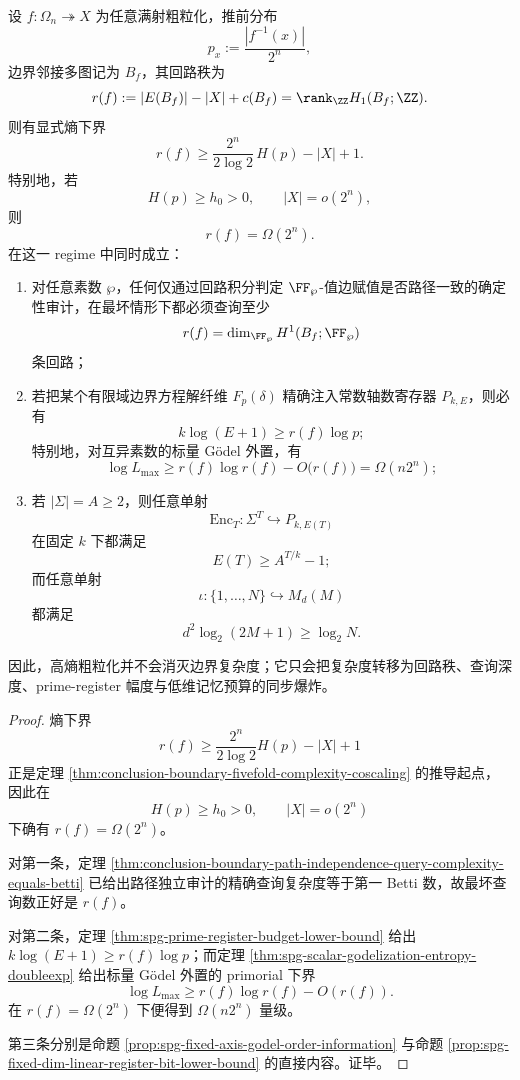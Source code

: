 \begin{theorem}\label{thm:conclusion-boundary-cycle-externalization-memory-barriers}
设 \(f:\Omega_n\twoheadrightarrow X\) 为任意满射粗粒化，推前分布
\[
p_x:=\frac{|f^{-1}(x)|}{2^n},
\]
边界邻接多图记为 \(B_f\)，其回路秩为
\[
r(f):=|E(B_f)|-|X|+c(B_f)=\rank_{\ZZ}H_1(B_f;\ZZ).
\]
则有显式熵下界
\[
r(f)\ge \frac{2^n}{2\log 2}\,H(p)-|X|+1.
\]
特别地，若
\[
H(p)\ge h_0>0,
\qquad
|X|=o(2^n),
\]
则
\[
r(f)=\Omega(2^n).
\]
在这一 regime 中同时成立：
\begin{enumerate}
  \item 对任意素数 \(\wp\)，任何仅通过回路积分判定 \(\FF_\wp\)-值边赋值是否路径一致的确定性审计，在最坏情形下都必须查询至少
  \[
  r(f)=\dim_{\FF_\wp}H^1(B_f;\FF_\wp)
  \]
  条回路；
  \item 若把某个有限域边界方程解纤维 \(F_p(\delta)\) 精确注入常数轴数寄存器 \(P_{k,E}\)，则必有
  \[
  k\log(E+1)\ge r(f)\log p;
  \]
  特别地，对互异素数的标量 Gödel 外置，有
  \[
  \log L_{\max}\ge r(f)\log r(f)-O\bigl(r(f)\bigr)=\Omega(n2^n);
  \]
  \item 若 \(|\Sigma|=A\ge 2\)，则任意单射
  \[
  \mathrm{Enc}_T:\Sigma^T\hookrightarrow P_{k,E(T)}
  \]
  在固定 \(k\) 下都满足
  \[
  E(T)\ge A^{T/k}-1;
  \]
  而任意单射
  \[
  \iota:\{1,\dots,N\}\hookrightarrow M_d(M)
  \]
  都满足
  \[
  d^2\log_2(2M+1)\ge \log_2 N.
  \]
\end{enumerate}
因此，高熵粗粒化并不会消灭边界复杂度；它只会把复杂度转移为回路秩、查询深度、prime-register 幅度与低维记忆预算的同步爆炸。
\end{theorem}
\begin{proof}
熵下界
\[
r(f)\ge \frac{2^n}{2\log 2}H(p)-|X|+1
\]
正是定理 \ref{thm:conclusion-boundary-fivefold-complexity-coscaling} 的推导起点，因此在
\[
H(p)\ge h_0>0,
\qquad
|X|=o(2^n)
\]
下确有 \(r(f)=\Omega(2^n)\)。

对第一条，定理 \ref{thm:conclusion-boundary-path-independence-query-complexity-equals-betti} 已给出路径独立审计的精确查询复杂度等于第一 Betti 数，故最坏查询数正好是 \(r(f)\)。

对第二条，定理 \ref{thm:spg-prime-register-budget-lower-bound} 给出 \(k\log(E+1)\ge r(f)\log p\)；而定理 \ref{thm:spg-scalar-godelization-entropy-doubleexp} 给出标量 Gödel 外置的 primorial 下界
\[
\log L_{\max}\ge r(f)\log r(f)-O(r(f)).
\]
在 \(r(f)=\Omega(2^n)\) 下便得到 \(\Omega(n2^n)\) 量级。

第三条分别是命题 \ref{prop:spg-fixed-axis-godel-order-information} 与命题 \ref{prop:spg-fixed-dim-linear-register-bit-lower-bound} 的直接内容。证毕。
\end{proof}

